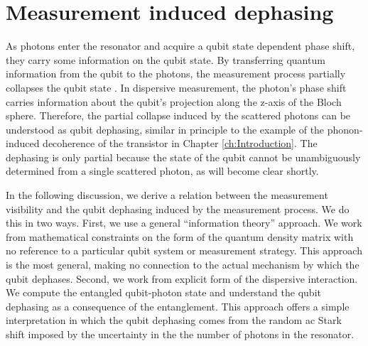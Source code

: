 \section{Measurement induced dephasing} \label{sec:measurementInducedDephasing}

As photons enter the resonator and acquire a qubit state dependent phase shift, they carry some information on the qubit state.
By transferring quantum information from the qubit to the photons, the measurement process partially collapses the qubit state \cite{Murch:trajectories2013}.
In dispersive measurement, the photon's phase shift carries information about the qubit's projection along the z-axis of the Bloch sphere.
Therefore, the partial collapse induced by the scattered photons can be understood as qubit dephasing, similar in principle to the example of the phonon-induced decoherence of the transistor in Chapter \ref{ch:Introduction}.
The dephasing is only partial because the state of the qubit cannot be unambiguously determined from a single scattered photon, as will become clear shortly.

In the following discussion, we derive a relation between the measurement visibility and the qubit dephasing induced by the measurement process.
We do this in two ways.
First, we use a general ``information theory'' approach.
We work from mathematical constraints on the form of the quantum density matrix with no reference to a particular qubit system or measurement strategy.
This approach is the most general, making no connection to the actual mechanism by which the qubit dephases.
Second, we work from explicit form of the dispersive interaction.
We compute the entangled qubit-photon state and understand the qubit dephasing as a consequence of the entanglement.
This approach offers a simple interpretation in which the qubit dephasing comes from the random ac Stark shift imposed by the uncertainty in the the number of photons in the resonator.





